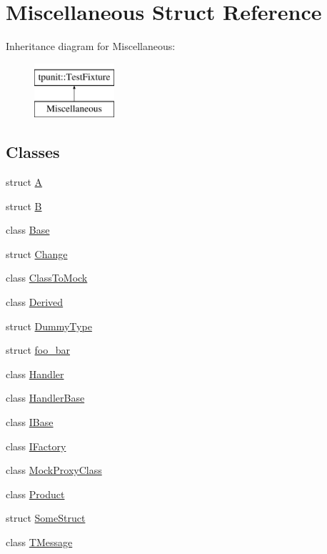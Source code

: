 \hypertarget{structMiscellaneous}{}\section{Miscellaneous Struct Reference}
\label{structMiscellaneous}
Inheritance diagram for Miscellaneous\+:\begin{figure}[H]
\begin{center}
\leavevmode
\includegraphics[height=2.000000cm]{structMiscellaneous}
\end{center}
\end{figure}
\subsection*{Classes}
\begin{DoxyCompactItemize}
\item 
struct \mbox{\hyperlink{structMiscellaneous_1_1A}{A}}
\item 
struct \mbox{\hyperlink{structMiscellaneous_1_1B}{B}}
\item 
class \mbox{\hyperlink{classMiscellaneous_1_1Base}{Base}}
\item 
struct \mbox{\hyperlink{structMiscellaneous_1_1Change}{Change}}
\item 
class \mbox{\hyperlink{classMiscellaneous_1_1ClassToMock}{Class\+To\+Mock}}
\item 
class \mbox{\hyperlink{classMiscellaneous_1_1Derived}{Derived}}
\item 
struct \mbox{\hyperlink{structMiscellaneous_1_1DummyType}{Dummy\+Type}}
\item 
struct \mbox{\hyperlink{structMiscellaneous_1_1foo__bar}{foo\+\_\+bar}}
\item 
class \mbox{\hyperlink{classMiscellaneous_1_1Handler}{Handler}}
\item 
class \mbox{\hyperlink{classMiscellaneous_1_1HandlerBase}{Handler\+Base}}
\item 
class \mbox{\hyperlink{classMiscellaneous_1_1IBase}{I\+Base}}
\item 
class \mbox{\hyperlink{classMiscellaneous_1_1IFactory}{I\+Factory}}
\item 
class \mbox{\hyperlink{classMiscellaneous_1_1MockProxyClass}{Mock\+Proxy\+Class}}
\item 
class \mbox{\hyperlink{classMiscellaneous_1_1Product}{Product}}
\item 
struct \mbox{\hyperlink{structMiscellaneous_1_1SomeStruct}{Some\+Struct}}
\item 
class \mbox{\hyperlink{classMiscellaneous_1_1TMessage}{T\+Message}}
\end{DoxyCompactItemize}
